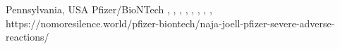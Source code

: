           {
            Pennsylvania, USA
          }
          {
          }
          {
            Pfizer/BioNTech
          }
          {
          }
          {
            ,
            ,
            ,
            ,
            ,
            ,
            ,
            ,
          }
          {
            https://nomoresilence.world/pfizer-biontech/naja-joell-pfizer-severe-adverse-reactions/
          }

